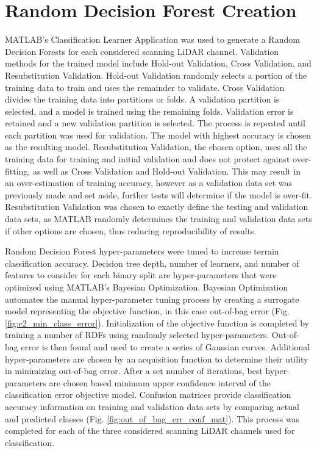 \documentclass[numbered,pdftex]{ohio-etd}
\begin{document}
{{	} %
	
	\section{Random Decision Forest Creation}\label{sec:random-decision-forest-creation}{
		
		{MATLAB's Classification Learner Application was used to generate a Random Decision Forests for each considered scanning LiDAR channel. Validation methods for the trained model include Hold-out Validation, Cross Validation, and Resubstitution Validation. Hold-out Validation randomly selects a portion of the training data to train and uses the remainder to validate. Cross Validation divides the training data into partitions or folds. A validation partition is selected, and a model is trained using the remaining folds. Validation error is retained and a new validation partition is selected. The process is repeated until each partition was used for validation. The model with highest accuracy is chosen as the resulting model. Resubstitution Validation, the chosen option, uses all the training data for training and initial validation and does not protect against over-fitting, as well as Cross Validation and Hold-out Validation. This may result in an over-estimation of training accuracy, however as a validation data set was previously made and set aside, further tests will determine if the model is over-fit. Resubstitution Validation was chosen to exactly define the testing and validation data sets, as MATLAB randomly determines the training and validation data sets if other options are chosen, thus reducing reproducibility of results.}
		
		{Random Decision Forest hyper-parameters were tuned to increase terrain classification accuracy. Decision tree depth, number of learners, and number of features to consider for each binary split are hyper-parameters that were optimized using MATLAB's Bayesian Optimization. Bayesian Optimization automates the manual hyper-parameter tuning process by creating a surrogate model representing the objective function, in this case out-of-bag error (Fig. \ref{fig:c2_min_class_error}). Initialization of the objective function is completed by training a number of RDFs using randomly selected hyper-parameters. Out-of-bag error is then found and used to create a series of Gaussian curves. Additional hyper-parameters are chosen by an acquisition function to determine their utility in minimizing out-of-bag error. After a set number of iterations, best hyper-parameters are chosen based minimum upper confidence interval of the classification error objective model. Confusion matrices provide classification accuracy information on training and validation data sets by comparing actual and predicted classes (Fig. \ref{fig:out_of_bag_err_conf_mat}). This process was completed for each of the three considered scanning LiDAR channels used for classification.}
			
}}
\end{document}
